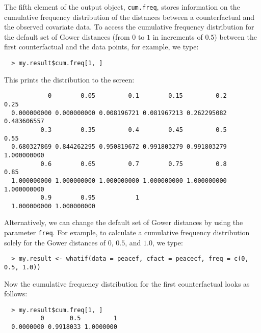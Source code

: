 \documentclass[oneside,letterpaper,titlepage]{article}
\begin{document}
The fifth element of the output object, \texttt{cum.freq}, stores information
on the cumulative frequency distribution of the distances
between a counterfactual and the observed covariate data.  To access
the cumulative frequency distribution for the default set of Gower
distances (from $0$ to $1$ in increments of $0.5$) between the first
counterfactual and the data points, for example, we type:
  \begin{verbatim}
  > my.result$cum.freq[1, ]
  \end{verbatim} %
This prints the distribution to the screen:
  \begin{verbatim}
            0        0.05         0.1        0.15         0.2        0.25         
  0.000000000 0.000000000 0.008196721 0.081967213 0.262295082 0.483606557          
          0.3        0.35         0.4        0.45         0.5        0.55
  0.680327869 0.844262295 0.950819672 0.991803279 0.991803279 1.000000000
          0.6        0.65         0.7        0.75         0.8        0.85         
  1.000000000 1.000000000 1.000000000 1.000000000 1.000000000 1.000000000
          0.9        0.95           1
  1.000000000 1.000000000
  \end{verbatim}
Alternatively, we can change the default set of Gower distances by
using the parameter \texttt{freq}.  For example, to calculate a
cumulative frequency distribution solely for the Gower distances of $0$,
$0.5$, and $1.0$, we type:
  \begin{verbatim}
  > my.result <- whatif(data = peacef, cfact = peacecf, freq = c(0, 0.5, 1.0))
  \end{verbatim}
Now the cumulative frequency distribution for the first counterfactual
looks as follows:
  \begin{verbatim}
  > my.result$cum.freq[1, ]
          0       0.5         1 
  0.0000000 0.9918033 1.0000000 
  \end{verbatim} %
\end{document}
